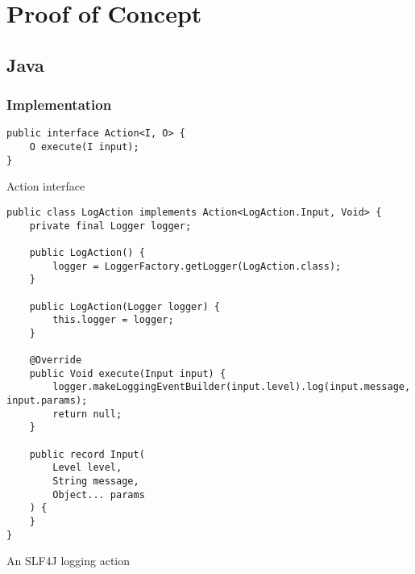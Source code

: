 \chapter{Proof of Concept}
\label{ch:proof-of-concept}

\section{Java}
\subsection{Implementation}

\begin{listing}[H]
\begin{verbatim}
public interface Action<I, O> {
    O execute(I input);
}
\end{verbatim}
\caption{Action interface}
\end{listing}

\begin{listing}[H]
\begin{verbatim}
public class LogAction implements Action<LogAction.Input, Void> {
    private final Logger logger;
    
    public LogAction() {
        logger = LoggerFactory.getLogger(LogAction.class);
    }
    
    public LogAction(Logger logger) {
        this.logger = logger;
    }
    
    @Override
    public Void execute(Input input) {
        logger.makeLoggingEventBuilder(input.level).log(input.message, input.params);
        return null;
    }
    
    public record Input(
        Level level,
        String message,
        Object... params
    ) {
    }
}
\end{verbatim}
\caption{An SLF4J logging action}
\end{listing}

